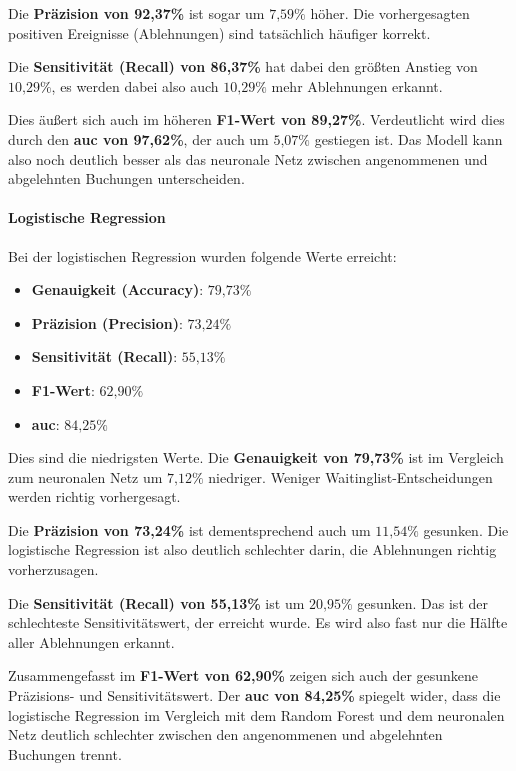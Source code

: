 Die \textbf{Präzision von 92,37\%} ist sogar um $7\text{,}59\%$ höher. Die vorhergesagten positiven Ereignisse (Ablehnungen) sind tatsächlich häufiger korrekt.

Die \textbf{Sensitivität (Recall) von 86,37\%} hat dabei den größten Anstieg von $10\text{,}29\%$, es werden dabei also auch $10\text{,}29\%$ mehr Ablehnungen erkannt.

Dies äußert sich auch im höheren \textbf{F1-Wert von 89,27\%}.
Verdeutlicht wird dies durch den \textbf{\gls{auc} von 97,62\%}, der auch um $5\text{,}07\%$ gestiegen ist. Das Modell kann also noch deutlich besser als das neuronale Netz zwischen angenommenen und abgelehnten Buchungen unterscheiden. 

\paragraph{Logistische Regression}
Bei der logistischen Regression wurden folgende Werte erreicht:
\begin{itemize}[noitemsep]
    \item \textbf{Genauigkeit (Accuracy)}: $79\text{,}73\%$
    \item \textbf{Präzision (Precision)}: $73\text{,}24\%$
    \item \textbf{Sensitivität (Recall)}: $55\text{,}13\%$
    \item \textbf{F1-Wert}: $62\text{,}90\%$
    \item \textbf{\gls{auc}}: $84\text{,}25\%$
\end{itemize}

Dies sind die niedrigsten Werte.
Die \textbf{Genauigkeit von 79,73\%} ist im Vergleich zum neuronalen Netz um $7\text{,}12\%$ niedriger.
Weniger Waitinglist-Entscheidungen werden richtig vorhergesagt.

Die \textbf{Präzision von 73,24\%} ist dementsprechend auch um $11\text{,}54\%$ gesunken.
Die logistische Regression ist also deutlich schlechter darin, die Ablehnungen richtig vorherzusagen.

Die \textbf{Sensitivität (Recall) von 55,13\%} ist um $20\text{,}95\%$ gesunken. Das ist der schlechteste Sensitivitätswert, der erreicht wurde. 
Es wird also fast nur die Hälfte aller Ablehnungen erkannt.

Zusammengefasst im \textbf{F1-Wert von 62,90\%} zeigen sich auch der gesunkene Präzisions- und Sensitivitätswert.
Der \textbf{\gls{auc} von 84,25\%} spiegelt wider, dass die logistische Regression im Vergleich mit dem Random Forest und dem neuronalen Netz deutlich schlechter zwischen den angenommenen und abgelehnten Buchungen trennt. 


